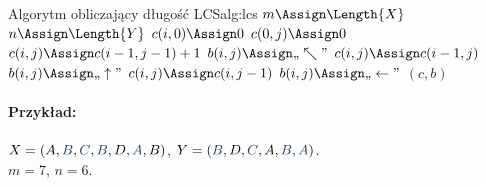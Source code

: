 \begin{alg}{Algorytm obliczający długość LCS}{alg:lcs}
	\State $m \Assign \Length{X}$
	\State $n \Assign \Length{Y}$
	\State $c(i, 0) \Assign 0$
	\EndFor
	\State $c(0, j) \Assign 0$
	\EndFor
	\State $c(i, j) \Assign c(i - 1, j - 1) + 1$
	\State $b(i, j) \Assign \text{,,}\nwarrow\text{''}$
	\State $c(i, j) \Assign c(i - 1, j)$
	\State $b(i, j) \Assign \text{,,}\uparrow\text{''}$
	\Else
	\State $c(i, j) \Assign c(i, j - 1)$
	\State $b(i, j) \Assign \text{,,}\leftarrow\text{''}$
	\EndIf
	\EndFor
	\EndFor
	\State \Return $(c, b)$
	\EndFunction
\end{alg}

\paragraph{Przykład:}
$X = (A, {\color{accent}B}, {\color{accent}C}, {\color{accent}B}, D, {\color{accent}A}, B)$, $Y =
	({\color{accent}B}, D, {\color{accent}C}, A, {\color{accent}B}, {\color{accent}A})$. \\
$m = 7$, $n = 6$.

